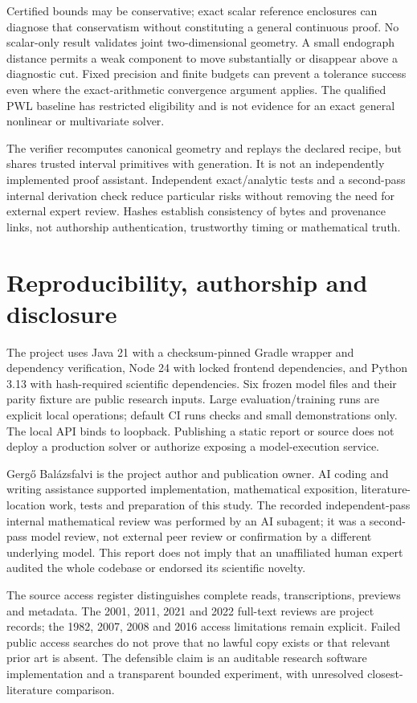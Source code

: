 \documentclass[10pt,a4paper]{article}
\begin{document}
Certified bounds may be conservative; exact scalar reference enclosures can
diagnose that conservatism without constituting a general continuous proof.
No scalar-only result validates joint two-dimensional geometry. A small
endograph distance permits a weak component to move substantially or disappear
above a diagnostic cut. Fixed precision and finite budgets can prevent a
tolerance success even where the exact-arithmetic convergence argument applies.
The qualified PWL baseline has restricted eligibility and is not evidence for
an exact general nonlinear or multivariate solver.

The verifier recomputes canonical geometry and replays the declared recipe,
but shares trusted interval primitives with generation. It is not an
independently implemented proof assistant. Independent exact/analytic tests
and a second-pass internal derivation check reduce particular risks without
removing the need for external expert review. Hashes establish consistency of
bytes and provenance links, not authorship authentication, trustworthy timing
or mathematical truth.

\section{Reproducibility, authorship and disclosure}
The project uses Java 21 with a checksum-pinned Gradle wrapper and dependency
verification, Node 24 with locked frontend dependencies, and Python 3.13 with
hash-required scientific dependencies. Six frozen model files and their parity
fixture are public research inputs. Large evaluation/training runs are explicit
local operations; default CI runs checks and small demonstrations only.
The local API binds to loopback. Publishing a static report or source does not
deploy a production solver or authorize exposing a model-execution service.

Gergő Balázsfalvi is the project author and publication owner. AI coding and
writing assistance supported implementation, mathematical exposition,
literature-location work, tests and preparation of this study. The recorded
independent-pass internal mathematical review was performed by an AI subagent;
it was a second-pass model review, not external peer review or confirmation by
a different underlying model. This report does not imply that an unaffiliated
human expert audited the whole codebase or endorsed its scientific novelty.

The source access register distinguishes complete reads, transcriptions,
previews and metadata.
The 2001, 2011, 2021 and 2022 full-text reviews are project records; the 1982,
2007, 2008 and 2016 access limitations remain explicit. Failed public access searches
do not prove that no lawful copy exists or that relevant prior art is absent.
The defensible claim is an auditable research software implementation and a
transparent bounded experiment, with unresolved closest-literature comparison.
\end{document}
